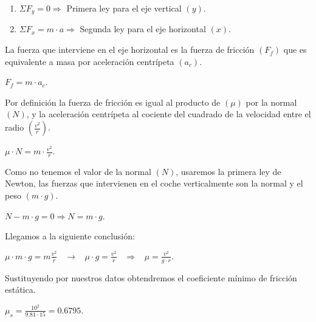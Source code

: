 \documentclass[a4paper,12pt]{article}
\begin{document}
\begin{enumerate}
    \item \(\Sigma F_y = 0 \Rightarrow\) \;\;\;\;\;\;\;\;\;\;\;\;\;\;\;\;\;\;\;\; Primera ley para el eje vertical \(\left(y\right)\).
    \item \(\Sigma F_x = m \cdot a \Rightarrow\) \;\;\;\;\;\;\;\;\;\;\;\;\;\; Segunda ley para el eje horizontal \(\left(x\right)\).
\end{enumerate}

\vspace{\baselineskip}
\begin{justify}
    La fuerza que interviene en el eje horizontal es la fuerza de fricción \(\left(F_f\right)\) que es equivalente a masa por aceleración centrípeta \(\left(a_c\right)\).
\end{justify}

\(F_f= m\cdot a_c\).

\begin{justify}
    Por definición la fuerza de fricción es igual al producto de \(\left(\mu\right)\) por la normal \(\left(N\right)\), y la aceleración centrípeta al cociente del cuadrado de la velocidad entre el radio \(\left(\frac{v^2}{r}\right)\).
\end{justify}

\(\mu \cdot N = m \cdot \frac{v^2}{r}\).

\begin{justify}
    Como no tenemos el valor de la normal \(\left(N\right)\), usaremos la primera ley de Newton, las fuerzas que intervienen en el coche verticalmente son la normal y el peso \(\left(m \cdot g\right)\).
\end{justify}

\(N - m \cdot g = 0 \Rightarrow N = m \cdot g \).

\begin{justify}
Llegamos a la siguiente conclusión:
\end{justify}

\(\mu \cdot m \cdot g = m \frac{v^2}{r} \;\;\; \rightarrow \;\;\; \mu \cdot g = \frac{v^2}{r} \;\;\; \Rightarrow \;\;\; \mu = \frac{v^2}{g \cdot r} .\)

\begin{justify}
    Sustituyendo por nuestros datos obtendremos el coeficiente mínimo de fricción estática.
\end{justify}

\(\mu_s = \frac{10^2}{9.81 \cdot 15} = 0.6795.\)

\vspace{\baselineskip}
\end{document}
